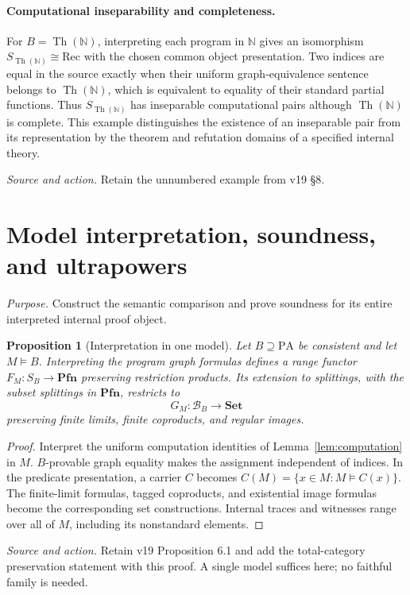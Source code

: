 \documentclass[11pt]{article}
\newtheorem{proposition}[theorem]{Proposition}
\theoremstyle{definition}\newtheorem{definition}[theorem]{Definition}
\newcommand{\PA}{\mathrm{PA}}
\newcommand{\N}{\mathbb N}
\newcommand{\Set}{\mathbf{Set}}
\newcommand{\Pfn}{\mathbf{Pfn}}
\newcommand{\Th}{\operatorname{Th}}
\newcommand{\B}{\mathcal B}
\newcommand{\source}[1]{\par\smallskip\noindent\textit{Source and action.} #1\par\smallskip}
\newcommand{\purpose}[1]{\noindent\textit{Purpose.} #1\par\medskip}
\begin{document}
\paragraph{Computational inseparability and completeness.}
For $B=\Th(\N)$, interpreting each program in $\N$ gives an
isomorphism $S_{\Th(\N)}\cong\mathrm{Rec}$ with the chosen common
object presentation. Two indices are equal in the source exactly
when their uniform graph-equivalence sentence belongs to
$\Th(\N)$, which is equivalent to equality of their standard
partial functions. Thus $S_{\Th(\N)}$ has inseparable computational
pairs although $\Th(\N)$ is complete. This example distinguishes
the existence of an inseparable pair from its representation by
the theorem and refutation domains of a specified internal theory.
\source{Retain the unnumbered example from v19 \S8.}

\section{Model interpretation, soundness, and ultrapowers}
\purpose{Construct the semantic comparison and prove soundness for its entire interpreted internal proof object.}

\begin{proposition}[Interpretation in one model]\label{prop:model}
Let $B\supseteq\PA$ be consistent and let $M\models B$.
Interpreting the program graph formulas defines a range functor
$F_M:S_B\to\Pfn$ preserving restriction products. Its extension
to splittings, with the subset splittings in $\Pfn$, restricts to
\[
 G_M:\B_B\longrightarrow\Set
\]
preserving finite limits, finite coproducts, and regular images.
\end{proposition}
\begin{proof}
Interpret the uniform computation identities of
Lemma~\ref{lem:computation} in $M$. $B$-provable graph equality
makes the assignment independent of indices. In the predicate
presentation, a carrier $C$ becomes
$C(M)=\{x\in M:M\models C(x)\}$. The finite-limit formulas,
tagged coproducts, and existential image formulas become the
corresponding set constructions. Internal traces and witnesses range
over all of $M$, including its nonstandard elements.
\end{proof}
\source{Retain v19 Proposition 6.1 and add the total-category preservation statement with this proof. A single model suffices here; no faithful family is needed.}
\end{document}
